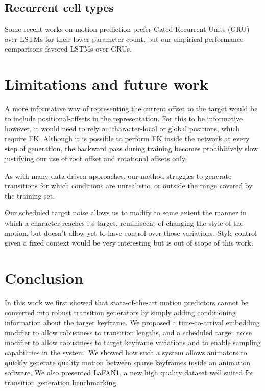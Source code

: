 \documentclass[acmtog]{acmart}
\begin{document}
\subsection{Recurrent cell types}
Some recent works on motion prediction prefer Gated Recurrent Units (GRU) over LSTMs for their lower parameter count, but our empirical performance comparisons favored LSTMs over GRUs.

\section{Limitations and future work}
A more informative way of representing the current offset to the target  would be to include positional-offsets in the representation. For this to be informative however, it would need to rely on character-local or global positions, which require FK. Although it is possible to perform FK inside the network at every step of generation, the backward pass during training becomes prohibitively slow justifying our use of root offset and rotational offsets only. 

As with many data-driven approaches, our method struggles to generate transitions for which conditions are unrealistic, or outside the range covered by the training set.

Our scheduled target noise allows us to modify to some extent the manner in which a character reaches its target, reminiscent of changing the style of the motion, but doesn't allow yet to have control over those variations. Style control given a fixed context would be very interesting but is out of scope of this work.





\section{Conclusion}
In this work we first showed that state-of-the-art motion predictors cannot be converted into robust transition generators by simply adding conditioning information about the target keyframe. We proposed a time-to-arrival embedding modifier to allow robustness to transition lengths, and a scheduled target noise modifier to allow robustness to target keyframe variations and to enable sampling capabilities in the system. We showed how such a system allows animators to quickly generate quality motion between sparse keyframes inside an animation software. We also presented LaFAN1, a new high quality dataset well suited for transition generation benchmarking.
\end{document}
